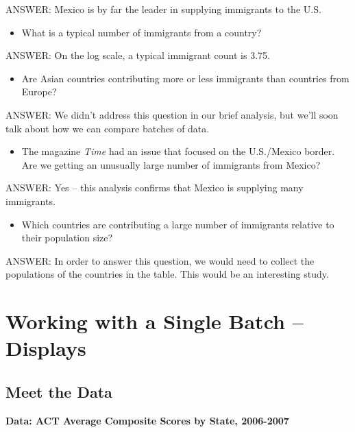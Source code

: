 \documentclass[
]{book}
\providecommand{\tightlist}{%
  \setlength{\itemsep}{0pt}\setlength{\parskip}{0pt}}
\begin{document}
ANSWER: Mexico is by far the leader in supplying immigrants to the U.S.

\begin{itemize}
\tightlist
\item
  What is a typical number of immigrants from a country?
\end{itemize}

ANSWER: On the log scale, a typical immigrant count is 3.75.

\begin{itemize}
\tightlist
\item
  Are Asian countries contributing more or less immigrants than countries from Europe?
\end{itemize}

ANSWER: We didn't address this question in our brief analysis, but we'll soon talk about how we can compare batches of data.

\begin{itemize}
\tightlist
\item
  The magazine \emph{Time} had an issue that focused on the U.S./Mexico border. Are we getting an unusually large number of immigrants from Mexico?
\end{itemize}

ANSWER: Yes -- this analysis confirms that Mexico is supplying many immigrants.

\begin{itemize}
\tightlist
\item
  Which countries are contributing a large number of immigrants relative to their population size?
\end{itemize}

ANSWER: In order to answer this question, we would need to collect the populations of the countries in the table. This would be an interesting study.

\hypertarget{working-with-a-single-batch-displays}{%
\chapter{Working with a Single Batch -- Displays}\label{working-with-a-single-batch-displays}}

\hypertarget{meet-the-data}{%
\section{Meet the Data}\label{meet-the-data}}

\textbf{Data: ACT Average Composite Scores by State, 2006-2007}
\end{document}
